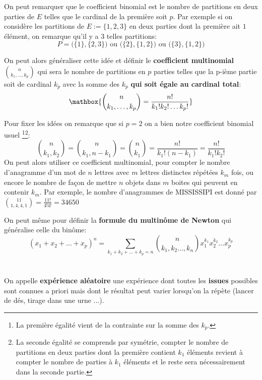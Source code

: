 \subsection*{}
On peut remarquer que le coefficient binomial est le nombre de partitions en deux parties de \(E\) telles que le cardinal de la première soit \(p\). Par exemple si on considère les partitions de \(E := \bigl\{1, 2, 3\bigl\}\) en deux parties dont la première ait \(1\) élément, on remarque qu'il y a 3 telles partitions:
\[
   P = \bigl(\{1\}, \{2, 3\}\bigl) \text{ ou } \bigl(\{2\}, \{1, 2\}\bigl) \text{ ou } \bigl(\{3\}, \{1, 2\}\bigl)
\]

On peut alors généraliser cette idée et définir le \textbf{coefficient multinomial} \(\binom{n}{k_1, \ldots, k_p}\) qui sera le nombre de partitions en \(p\) parties telles que la p-ième partie soit de cardinal \(k_p\) avec la somme des \(k_p\) \textbf{qui soit égale au cardinal total}:
\[
   \mathbox{
      \binom{n}{k_1, \ldots, k_p} = \frac{n!}{k_1! k_2!\ldots k_p!}
   }
\]

Pour fixer les idées on remarque que si \(p = 2\) on a bien notre coefficient binomial usuel \footnote{
   La première égalité vient de la contrainte sur la somme des \(k_p\).
}\footnote{La seconde égalité se comprends par symétrie, compter le nombre de partitions en deux parties dont la première contient \(k_1\) éléments revient à compter le nombre de parties à \(k_1\) éléments et le reste sera nécessairement dans la seconde partie.}:
\[
   \binom{n}{k_1, k_2} =  \binom{n}{k_1, n - k_1} = \binom{n}{k_1} = \frac{n!}{k_1!(n-k_1)} = \frac{n!}{k_1!k_2!}
\]
On peut alors utiliser ce coefficient multinomial, pour compter le nombre d'anagramme d'un mot de \(n\) lettres avec \(m\) lettres distinctes répétées \(k_m\) fois, ou encore le nombre de façon de mettre \(n\) objets dans \(m\) boites qui peuvent en contenir \(k_m\).\+
Par exemple, le nombre d'anagrammes de MISSISSIPI est donné par \(\binom{11}{1 , 4, 4, 1}  = \frac{11!}{4!4!} = 34650\)\<

On peut même pour définir la \textbf{formule du multinôme de Newton} qui généralise celle du binôme:
\[
   (x_1 + x_2 + \ldots + x_p)^n = \sum_{k_1+k_2+\ldots+k_p = n} \binom{n}{k_1, k_2 \ldots, k_n} x_1^{k_1} x_2^{k_2} \ldots x_p^{k_p}
\]

\chapter*{}
On appelle \textbf{expérience aléatoire} une expérience dont toutes les \textbf{issues} possibles sont connues a priori mais
dont le résultat peut varier lorsqu'on la répète (lancer de dés, tirage dans une urne ...).

